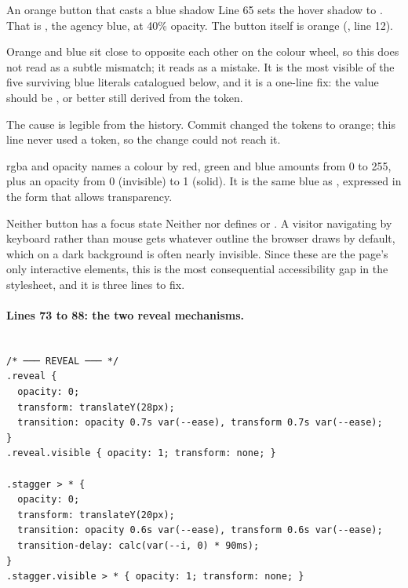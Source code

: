 \begin{honest}{An orange button that casts a blue shadow}
Line 65 sets the hover shadow to . That is
, the agency blue, at 40\% opacity. The button itself is orange
(, line 12).

Orange and blue sit close to opposite each other on the colour wheel, so this does
not read as a subtle mismatch; it reads as a mistake. It is the most visible of the
five surviving blue literals catalogued below, and it is a one-line fix: the value
should be , or better still derived from the token.

The cause is legible from the history. Commit  changed the tokens to
orange; this line never used a token, so the change could not reach it.
\end{honest}

\begin{jargon}{rgba and opacity}
 names a colour by red, green and blue amounts from 0 to
255, plus an opacity from 0 (invisible) to 1 (solid). It is the same blue as
, expressed in the form that allows transparency.
\end{jargon}

\begin{honest}{Neither button has a focus state}
Neither  nor  defines  or
. A visitor navigating by keyboard rather than mouse gets
whatever outline the browser draws by default, which on a dark background is often
nearly invisible. Since these are the page's only interactive elements, this is the
most consequential accessibility gap in the stylesheet, and it is three lines to
fix.
\end{honest}

\paragraph{Lines 73 to 88: the two reveal mechanisms.}

\begin{lstlisting}[firstnumber=73,caption={\file{css/site.css}, lines 73--88}]

/* ─── REVEAL ─── */
.reveal {
  opacity: 0;
  transform: translateY(28px);
  transition: opacity 0.7s var(--ease), transform 0.7s var(--ease);
}
.reveal.visible { opacity: 1; transform: none; }

.stagger > * {
  opacity: 0;
  transform: translateY(20px);
  transition: opacity 0.6s var(--ease), transform 0.6s var(--ease);
  transition-delay: calc(var(--i, 0) * 90ms);
}
.stagger.visible > * { opacity: 1; transform: none; }
\end{lstlisting}

